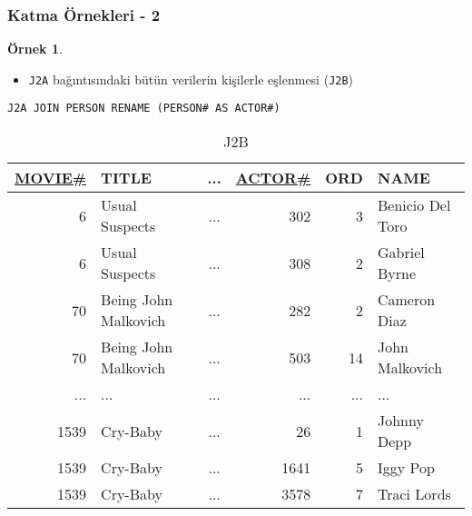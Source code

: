 \documentclass[dvipsnames]{beamer}
\theoremstyle{definition}
\theoremstyle{example}
\newtheorem{ornek}[theorem]{Örnek}
\theoremstyle{plain}
\begin{document}
\begin{frame}[fragile]
  \frametitle{Katma Örnekleri - 2}

  \begin{ornek}
    \begin{itemize}
      \item \texttt{J2A} bağıntısındaki bütün verilerin kişilerle eşlenmesi
        (\texttt{J2B})
    \end{itemize}

    \begin{lstlisting}
J2A JOIN PERSON RENAME (PERSON# AS ACTOR#)
    \end{lstlisting}

    \pause
    \vspace{-10pt}
    \begin{tiny}
    \begin{table}
      \caption{J2B}
      \begin{tabular}{|r|l|c|r|r|l|}\hline
\underline{MOVIE\#} & TITLE & ... & \underline{ACTOR\#} & ORD & NAME\\[2pt]\hline\hline
   6 & Usual Suspects       & ... &     302 &   3 & Benicio Del Toro\\\hline
   6 & Usual Suspects       & ... &     308 &   2 & Gabriel Byrne   \\\hline
  70 & Being John Malkovich & ... &     282 &   2 & Cameron Diaz    \\\hline
  70 & Being John Malkovich & ... &     503 &  14 & John Malkovich  \\\hline
 ... & ...                  & ... &     ... & ... & ...             \\\hline
1539 & Cry-Baby             & ... &      26 &   1 & Johnny Depp     \\\hline
1539 & Cry-Baby             & ... &    1641 &   5 & Iggy Pop        \\\hline
1539 & Cry-Baby             & ... &    3578 &   7 & Traci Lords     \\\hline
      \end{tabular}
    \end{table}
    \end{tiny}
  \end{ornek}
\end{frame}
\end{document}
